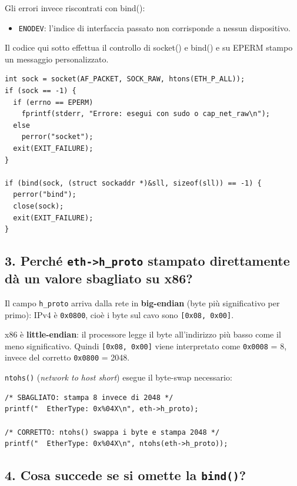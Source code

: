 \documentclass[a4paper,12pt]{article}
\begin{document}
Gli errori invece riscontrati con bind():

\begin{itemize}
  \item \texttt{ENODEV}: l'indice di interfaccia passato non corrisponde a nessun dispositivo.
\end{itemize}

Il codice qui sotto effettua il controllo di socket() e bind() e su EPERM
stampo un messaggio personalizzato.
\begin{lstlisting}[caption={Controllo socket() e bind()}]
int sock = socket(AF_PACKET, SOCK_RAW, htons(ETH_P_ALL));
if (sock == -1) {
  if (errno == EPERM)
    fprintf(stderr, "Errore: esegui con sudo o cap_net_raw\n");
  else
    perror("socket");
  exit(EXIT_FAILURE);
}

if (bind(sock, (struct sockaddr *)&sll, sizeof(sll)) == -1) {
  perror("bind");
  close(sock);
  exit(EXIT_FAILURE);
}
\end{lstlisting}

\subsection{3. Perché \texttt{eth->h\_proto} stampato direttamente dà un valore sbagliato su x86?}

Il campo \texttt{h\_proto} arriva dalla rete in \textbf{big-endian} (byte più significativo
per primo): IPv4 è \texttt{0x0800}, cioè i byte sul cavo sono \texttt{[0x08, 0x00]}.

x86 è \textbf{little-endian}: il processore legge il byte all'indirizzo più basso come
il meno significativo. Quindi \texttt{[0x08, 0x00]} viene interpretato come
\texttt{0x0008} = 8, invece del corretto \texttt{0x0800} = 2048.

\texttt{ntohs()} (\textit{network to host short}) esegue il byte-swap necessario:

\begin{lstlisting}[caption={Senza e con conversione}]
/* SBAGLIATO: stampa 8 invece di 2048 */
printf("  EtherType: 0x%04X\n", eth->h_proto);

/* CORRETTO: ntohs() swappa i byte e stampa 2048 */
printf("  EtherType: 0x%04X\n", ntohs(eth->h_proto));
\end{lstlisting}

\subsection{4. Cosa succede se si omette la \texttt{bind()}?}
\end{document}
